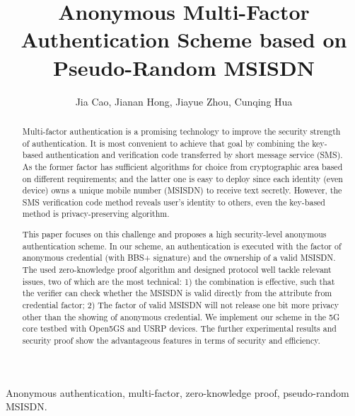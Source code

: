 \documentclass[lettersize,journal]{IEEEtran}
\begin{document}
\title{Anonymous Multi-Factor Authentication Scheme based on Pseudo-Random MSISDN}
\author{Jia Cao, Jianan Hong, Jiayue Zhou, Cunqing Hua}

\maketitle

\begin{abstract}
Multi-factor authentication is a promising technology to improve the security strength of authentication. It is most convenient to achieve that goal by combining the key-based authentication and verification code transferred by short message service (SMS). As the former factor has sufficient algorithms for choice from cryptographic area based on different requirements; and the latter one is easy to deploy since each identity (even device) owns a unique mobile number (MSISDN) to receive text secretly. However, the SMS verification code method reveals user's identity to others, even the key-based method is privacy-preserving algorithm.

This paper focuses on this challenge and proposes a high security-level anonymous authentication scheme. In our scheme, an authentication is executed with the factor of anonymous credential (with BBS+ signature) and the ownership of a valid MSISDN. The used zero-knowledge proof algorithm and designed protocol well tackle relevant issues, two of which are the most technical: 1) the combination is effective, such that the verifier can check whether the MSISDN is valid directly from the attribute from credential factor; 2) The factor of valid MSISDN will not release one bit more privacy other than the showing of anonymous credential. We implement our scheme in the 5G core testbed with Open5GS and USRP devices. The further experimental results and security proof show the advantageous features in terms of security and efficiency.
\end{abstract}

\begin{IEEEkeywords}
Anonymous authentication, multi-factor, zero-knowledge proof, pseudo-random MSISDN.
\end{IEEEkeywords}



%








%
%
%
%
%
%
%
%
%
%
%
%
\end{document}
